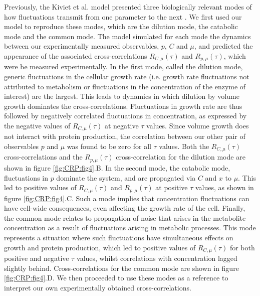 Previously, the Kiviet et al. model 
presented three biologically relevant modes of how fluctuations transmit from one parameter to the next \cite{Kiviet2014}.
%
We first used our model to reproduce these modes,
which are the dilution mode, the catabolic mode and the common mode.
%
The model simulated for each mode the dynamics between our experimentally measured observables, $p$, $C$ and $\mu$,
and predicted the appearance of the associated cross-correlations %
 $R_{C,\mu}(\tau)$ and $R_{p,\mu}(\tau)$, which were be measured experimentally. %
%
In the first mode, called the dilution mode, 
generic fluctuations in the cellular growth rate 
(i.e. growth rate fluctuations not attributed to metabolism or fluctuations in the concentration of the enzyme of interest) are the largest. 
This  leads to dynamics in which dilution by volume growth dominates the cross-correlations.
Fluctuations in growth rate are thus followed by negatively correlated fluctuations in concentration, as expressed by the negative values of $R_{C,\mu}(\tau)$ at negative $\tau$ values.
Since volume growth does not interact with protein production, the correlation between our other pair of observables $p$ and $\mu$ was found to be zero for all $\tau$ values.
Both the $R_{C,\mu}(\tau)$ cross-correlations and the $R_{p,\mu}(\tau)$ cross-correlation for the dilution mode are shown in figure \ref{fig:CRP:fig4}.B.
%
In the second mode, the catabolic mode,
fluctuations in $p$ dominate the system, and are propagated via $C$ and $x$ to $\mu$.
This led to  positive values of $R_{C,\mu}(\tau)$ and $R_{p,\mu}(\tau)$ at positive $\tau$ values, 
as shown in figure \ref{fig:CRP:fig4}.C.
Such a mode implies that concentration fluctuations can have cell-wide consequences, even affecting the growth rate of the cell.
%
Finally, the common mode relates to propagation of noise that arises in the metabolite concentration as a result of fluctuations arising in metabolic processes.
This mode represents a situation where such fluctuations have simultaneous effects on growth and protein production, which led to positive values of $R_{C,\mu}(\tau)$ for both 
positive and negative $\tau$ values, whilst correlations with concentration lagged slightly behind.
Cross-correlations for the common mode are shown in figure \ref{fig:CRP:fig4}.D.
%
We then proceeded to use these modes as a reference to interpret our own experimentally obtained cross-correlations.

